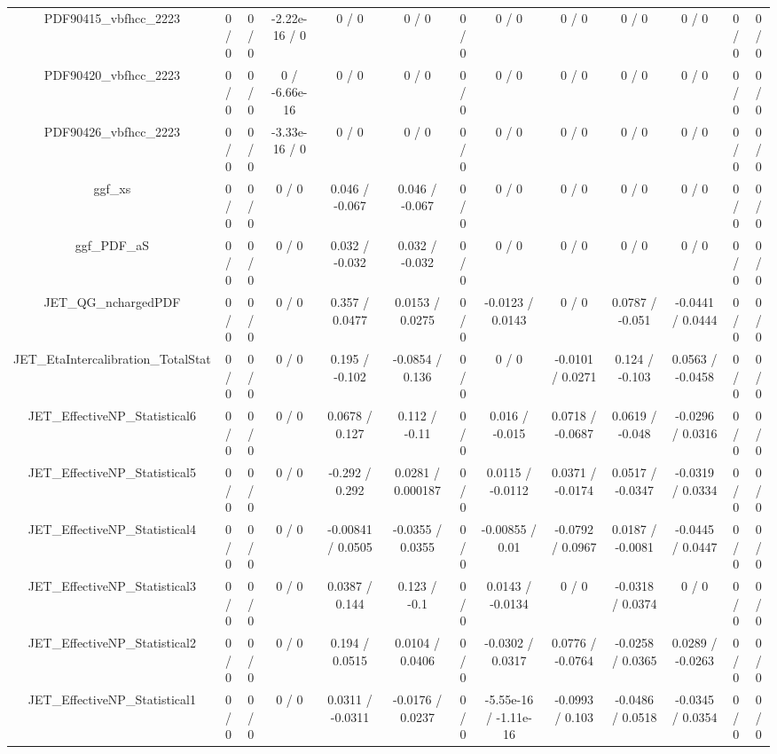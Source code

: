 \documentclass[10pt]{article}
\begin{document}
\begin{table}[htbp]
\begin{center}
\begin{tabular}{|c|c|c|c|c|c|c|c|c|c|c|c|c|}
  PDF90415_vbfhcc_2223 & 0 / 0 & 0 / 0 & -2.22e-16 / 0 & 0 / 0 & 0 / 0 & 0 / 0 & 0 / 0 & 0 / 0 & 0 / 0 & 0 / 0 & 0 / 0 & 0 / 0 \\ 
  PDF90420_vbfhcc_2223 & 0 / 0 & 0 / 0 & 0 / -6.66e-16 & 0 / 0 & 0 / 0 & 0 / 0 & 0 / 0 & 0 / 0 & 0 / 0 & 0 / 0 & 0 / 0 & 0 / 0 \\ 
  PDF90426_vbfhcc_2223 & 0 / 0 & 0 / 0 & -3.33e-16 / 0 & 0 / 0 & 0 / 0 & 0 / 0 & 0 / 0 & 0 / 0 & 0 / 0 & 0 / 0 & 0 / 0 & 0 / 0 \\ 
  ggf_xs & 0 / 0 & 0 / 0 & 0 / 0 & 0.046 / -0.067 & 0.046 / -0.067 & 0 / 0 & 0 / 0 & 0 / 0 & 0 / 0 & 0 / 0 & 0 / 0 & 0 / 0 \\ 
  ggf_PDF_aS & 0 / 0 & 0 / 0 & 0 / 0 & 0.032 / -0.032 & 0.032 / -0.032 & 0 / 0 & 0 / 0 & 0 / 0 & 0 / 0 & 0 / 0 & 0 / 0 & 0 / 0 \\ 
  JET_QG_nchargedPDF & 0 / 0 & 0 / 0 & 0 / 0 & 0.357 / 0.0477 & 0.0153 / 0.0275 & 0 / 0 & -0.0123 / 0.0143 & 0 / 0 & 0.0787 / -0.051 & -0.0441 / 0.0444 & 0 / 0 & 0 / 0 \\ 
  JET_EtaIntercalibration_TotalStat & 0 / 0 & 0 / 0 & 0 / 0 & 0.195 / -0.102 & -0.0854 / 0.136 & 0 / 0 & 0 / 0 & -0.0101 / 0.0271 & 0.124 / -0.103 & 0.0563 / -0.0458 & 0 / 0 & 0 / 0 \\ 
  JET_EffectiveNP_Statistical6 & 0 / 0 & 0 / 0 & 0 / 0 & 0.0678 / 0.127 & 0.112 / -0.11 & 0 / 0 & 0.016 / -0.015 & 0.0718 / -0.0687 & 0.0619 / -0.048 & -0.0296 / 0.0316 & 0 / 0 & 0 / 0 \\ 
  JET_EffectiveNP_Statistical5 & 0 / 0 & 0 / 0 & 0 / 0 & -0.292 / 0.292 & 0.0281 / 0.000187 & 0 / 0 & 0.0115 / -0.0112 & 0.0371 / -0.0174 & 0.0517 / -0.0347 & -0.0319 / 0.0334 & 0 / 0 & 0 / 0 \\ 
  JET_EffectiveNP_Statistical4 & 0 / 0 & 0 / 0 & 0 / 0 & -0.00841 / 0.0505 & -0.0355 / 0.0355 & 0 / 0 & -0.00855 / 0.01 & -0.0792 / 0.0967 & 0.0187 / -0.0081 & -0.0445 / 0.0447 & 0 / 0 & 0 / 0 \\ 
  JET_EffectiveNP_Statistical3 & 0 / 0 & 0 / 0 & 0 / 0 & 0.0387 / 0.144 & 0.123 / -0.1 & 0 / 0 & 0.0143 / -0.0134 & 0 / 0 & -0.0318 / 0.0374 & 0 / 0 & 0 / 0 & 0 / 0 \\ 
  JET_EffectiveNP_Statistical2 & 0 / 0 & 0 / 0 & 0 / 0 & 0.194 / 0.0515 & 0.0104 / 0.0406 & 0 / 0 & -0.0302 / 0.0317 & 0.0776 / -0.0764 & -0.0258 / 0.0365 & 0.0289 / -0.0263 & 0 / 0 & 0 / 0 \\ 
  JET_EffectiveNP_Statistical1 & 0 / 0 & 0 / 0 & 0 / 0 & 0.0311 / -0.0311 & -0.0176 / 0.0237 & 0 / 0 & -5.55e-16 / -1.11e-16 & -0.0993 / 0.103 & -0.0486 / 0.0518 & -0.0345 / 0.0354 & 0 / 0 & 0 / 0 \\ 

\end{tabular}
\end{center}
\end{table}
\end{document}
